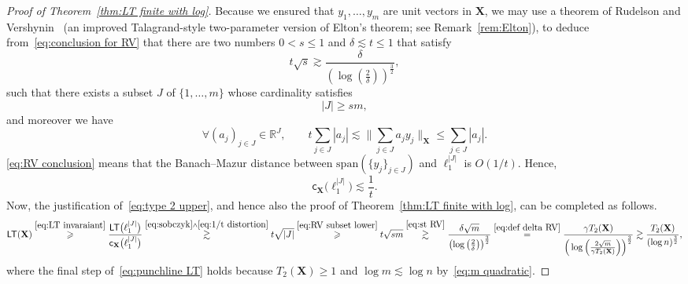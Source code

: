 \documentclass[11pt,reqno]{amsart}
\renewcommand{\le}{\leqslant}
\renewcommand{\ge}{\geqslant}
\renewcommand{\d}{\delta}
\newcommand{\cc}{\mathsf{c}}
\newcommand{\m}{\{1,\ldots,m\}}
\newcommand{\X}{\mathbf X}
\newcommand{\R}{\mathbb R}
\theoremstyle{remark}
\renewcommand{\1}{\mathbf 1}
\newcommand{\spn}{\mathrm{ span}}
\newcommand{\LT}{\mathsf{LT}}
\begin{document}
\begin{proof}[Proof of Theorem~\ref{thm:LT finite with log}]
Because we ensured that $y_1,\ldots,y_m$ are unit vectors in $\X$, we may use a theorem of Rudelson and Vershynin~\cite[Theorem~7.4]{RV06} (an improved Talagrand-style two-parameter version of Elton's theorem; see Remark~\ref{rem:Elton}), to deduce  from~\eqref{eq:conclusion for RV} that there are two numbers $0<s\le 1$ and  $\d\lesssim t\le 1$ that satisfy
\begin{equation}\label{eq:st RV}
t\sqrt{s}\gtrsim \frac{\d}{\left(\log\left(\frac{2}{\d}\right)\right)^{\frac32}},
\end{equation}
such that there exists a subset $J$ of $\m$ whose cardinality satisfies
\begin{equation}\label{eq:RV subset lower}
|J|\ge sm,
\end{equation}
and moreover we have
\begin{equation}\label{eq:RV conclusion}
\forall (a_j)_{j\in J}\in \R^J,\qquad t\sum_{j\in J} |a_j|\lesssim \Big\|\sum_{j\in J} a_j y_j\Big\|_{\X}\le \sum_{j\in J} |a_j|.
\end{equation}
\eqref{eq:RV conclusion} means that the Banach--Mazur distance between $\spn(\{y_j\}_{j\in J})$ and $\ell_1^{|J|}$ is $O(1/t)$. Hence,
\begin{equation}\label{eq:1/t distortion}
\cc_{\X}\big(\ell_1^{|J|}\big)\lesssim \frac{1}{t}.
\end{equation}
Now, the justification of~\eqref{eq:type 2 upper}, and hence also the proof of Theorem~\ref{thm:LT finite with log},  can be completed as follows.
\begin{align}\label{eq:punchline LT}
\LT(\X)\stackrel{\eqref{eq:LT invaraiant}}{\ge}\frac{\LT\big(\ell_1^{|J|}\big)}{\cc_{\X}\big(\ell_1^{|J|}\big)}\stackrel{\eqref{eq:sobczyk} \wedge \eqref{eq:1/t distortion}}{\gtrsim} t\sqrt{|J|}\stackrel{\eqref{eq:RV subset lower}}{\ge} t\sqrt{sm}\stackrel{\eqref{eq:st RV}}{\gtrsim} \frac{\d\sqrt{m}}{\left(\log\left(\frac{2}{\d}\right)\right)^{\frac32}}
\stackrel{\eqref{eq:def delta RV}}{=} \frac{\gamma T_2(\X)}{ \Big(\log\Big(\frac{2\sqrt{m}}{\gamma T_2(\X)}\Big)\Big)^{\frac32}}\gtrsim \frac{T_2(\X)}{(\log n)^\frac32},
\end{align}
where the final step of~\eqref{eq:punchline LT} holds because $T_2(\X)\ge 1$ and $ \log m\lesssim \log n$ by~\eqref{eq:m quadratic}.
\end{proof}
\end{document}
